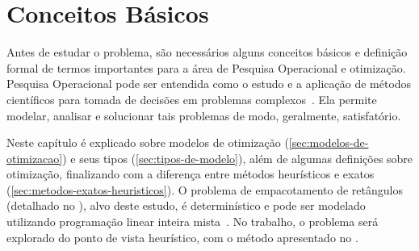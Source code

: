 \chapter{Conceitos Básicos}\label{ch:conceitos-basicos}

Antes de estudar o problema, são necessários alguns conceitos básicos e definição formal de termos
importantes para a área de Pesquisa Operacional e otimização.
Pesquisa Operacional pode ser entendida como o estudo e a aplicação de métodos científicos para
tomada de decisões em problemas complexos~\cite[p.IX]{arenales}.
Ela permite modelar, analisar e solucionar tais problemas de modo, geralmente, satisfatório.

Neste capítulo é explicado sobre modelos de otimização (\autoref{sec:modelos-de-otimizacao})
e seus tipos (\autoref{sec:tipos-de-modelo}), além de algumas definições sobre otimização,
finalizando com a diferença entre métodos heurísticos e exatos
(\cref{sec:metodos-exatos-heuristicos}).
O problema de empacotamento de retângulos (detalhado no ),
alvo deste estudo, é determinístico e pode ser modelado utilizando programação linear inteira
mista~\cite{wolsey2020integer}.
No trabalho, o problema será explorado do ponto de vista heurístico, com o método apresentado no
.





